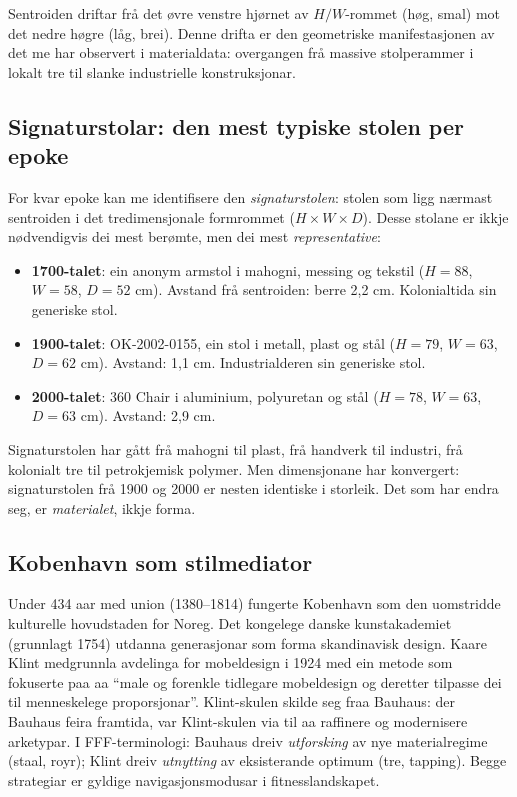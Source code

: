 \documentclass[10pt, a4paper, twocolumn]{article}
\begin{document}
Sentroiden driftar frå det øvre venstre hjørnet av $H/W$-rommet (høg, smal) mot det nedre høgre (låg, brei). Denne drifta er den geometriske manifestasjonen av det me har observert i materialdata: overgangen frå massive stolperammer i lokalt tre til slanke industrielle konstruksjonar.

\subsection{Signaturstolar: den mest typiske stolen per epoke}

For kvar epoke kan me identifisere den \emph{signaturstolen}: stolen som ligg nærmast sentroiden i det tredimensjonale formrommet ($H \times W \times D$). Desse stolane er ikkje nødvendigvis dei mest berømte, men dei mest \emph{representative}:

\begin{itemize}
  \item \textbf{1700-talet}: ein anonym armstol i mahogni, messing og tekstil ($H = 88$, $W = 58$, $D = 52$ cm). Avstand frå sentroiden: berre 2,2 cm. Kolonialtida sin generiske stol.
  \item \textbf{1900-talet}: OK-2002-0155, ein stol i metall, plast og stål ($H = 79$, $W = 63$, $D = 62$ cm). Avstand: 1,1 cm. Industrialderen sin generiske stol.
  \item \textbf{2000-talet}: 360 Chair i aluminium, polyuretan og stål ($H = 78$, $W = 63$, $D = 63$ cm). Avstand: 2,9 cm.
\end{itemize}

Signaturstolen har gått frå mahogni til plast, frå handverk til industri, frå kolonialt tre til petrokjemisk polymer. Men dimensjonane har konvergert: signaturstolen frå 1900 og 2000 er nesten identiske i storleik. Det som har endra seg, er \emph{materialet}, ikkje forma.

\subsection{Kobenhavn som stilmediator}

Under 434 aar med union (1380--1814) fungerte Kobenhavn som den uomstridde kulturelle hovudstaden for Noreg. Det kongelege danske kunstakademiet (grunnlagt 1754) utdanna generasjonar som forma skandinavisk design. Kaare Klint medgrunnla avdelinga for mobeldesign i 1924 med ein metode som fokuserte paa aa ``male og forenkle tidlegare mobeldesign og deretter tilpasse dei til menneskelege proporsjonar''. Klint-skulen skilde seg fraa Bauhaus: der Bauhaus feira framtida, var Klint-skulen via til aa raffinere og modernisere arketypar. I FFF-terminologi: Bauhaus dreiv \emph{utforsking} av nye materialregime (staal, royr); Klint dreiv \emph{utnytting} av eksisterande optimum (tre, tapping). Begge strategiar er gyldige navigasjonsmodusar i fitnesslandskapet.
\end{document}
